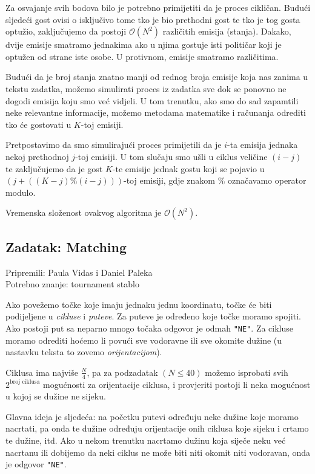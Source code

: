\documentclass[a4paper]{article}
\begin{document}
Za osvajanje svih bodova bilo je potrebno primijetiti da je proces cikličan.
Budući sljedeći gost ovisi o isključivo tome tko je bio prethodni gost te tko
je tog gosta optužio, zaključujemo da postoji $\mathcal{O}(N^2)$ različitih emisija
(stanja). Dakako, dvije emisije smatramo jednakima ako u njima gostuje isti
političar koji je optužen od strane iste osobe. U protivnom, emisije smatramo
različitima.

Budući da je broj stanja znatno manji od rednog broja emisije koja nas zanima u
tekstu zadatka, možemo simulirati proces iz zadatka sve dok se ponovno ne
dogodi emisija koju smo već vidjeli. U tom trenutku, ako smo do sad zapamtili
neke relevantne informacije, možemo metodama matematike i računanja odrediti
tko će gostovati u $K$-toj emisiji.

Pretpostavimo da smo simulirajući proces primijetili da je $i$-ta emisija jednaka
nekoj prethodnoj $j$-toj emisiji. U tom slučaju smo ušli u ciklus veličine $(i-j)$ te
zaključujemo da je gost $K$-te emisije jednak gostu koji se pojavio u $(j + ((K -
j) \% (i - j)))$-toj emisiji, gdje znakom $\%$ označavamo operator modulo.

Vremenska složenost ovakvog algoritma je $\mathcal{O}(N^2)$.

\subsection*{Zadatak: Matching}
\textsf{Pripremili: Paula Vidas i Daniel Paleka}\\
\textsf{Potrebno znanje: tournament stablo}

Ako povežemo točke koje imaju jednaku jednu koordinatu, točke će biti
podijeljene u \textit{cikluse} i \textit{puteve}. Za puteve je određeno koje
točke moramo spojiti. Ako postoji put sa neparno mnogo točaka odgovor je odmah
\texttt{"NE"}. Za cikluse moramo odrediti hoćemo li povući sve vodoravne ili sve okomite
dužine (u nastavku teksta to zovemo \textit{orijentacijom}).

Ciklusa ima najviše $\frac{N}{4}$, pa za podzadatak $(N \le 40)$ možemo
isprobati svih $2^{\text{broj ciklusa}}$ mogućnosti za orijentacije ciklusa, i
provjeriti postoji li neka mogućnost u kojoj se dužine ne sijeku.

Glavna ideja je sljedeća: na početku putevi određuju neke dužine koje moramo
nacrtati, pa onda te dužine određuju orijentacije onih ciklusa koje sijeku i
crtamo te dužine, itd. Ako u nekom trenutku nacrtamo dužinu koja siječe neku
već nacrtanu ili dobijemo da neki ciklus ne može biti niti okomit niti
vodoravan, onda je odgovor \texttt{"NE"}.
\end{document}
